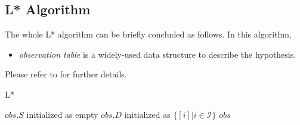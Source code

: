 \documentclass[conference, a4paper]{IEEEtran}
\newtheorem{definition}{Definition}
\newcommand{\rread}[0]{\rhd}
\newcommand{\rnoread}[0]{\otimes}
\newcommand{\rempty}[0]{\varnothing}
\begin{document}





\subsection{L* Algorithm}
The whole L* algorithm can be briefly concluded as follows. In this algorithm,
\begin{itemize}
  \item \emph{observation table} is a widely-used data structure to describe the hypothesis.
\end{itemize}
Please refer to \cite{DBLP:conf/sfm/SteffenHM11, DBLP:journals/iandc/Angluin87} for further details.
\begin{algorithm} 
  \caption{L*} 
  \label{alg:lstar}
  $obs.S$ initialized as empty\;
  $obs.D$ initialized as $\{[i]|i\in\mathcal{I}\}$\;
  \Return $obs$\; 
\end{algorithm}
\end{document}
